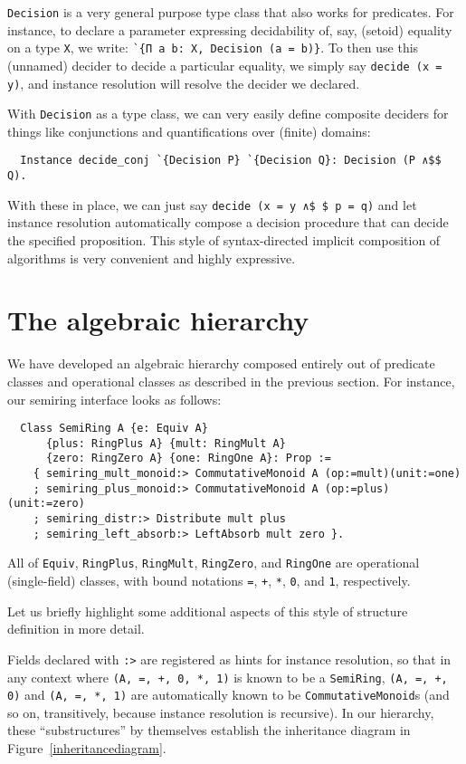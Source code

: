 \documentclass[a4paper,10pt,runningheads]{llncs}
\begin{document}
\lstinline|Decision| is a very general purpose type class that also works for predicates. For instance, to declare a parameter expressing decidability of, say, (setoid) equality on a type \lstinline|X|, we write: \lstinline|`{Π a b: X, Decision (a = b)}|. To then use this (unnamed) decider to decide a particular equality, we simply say \lstinline|decide (x = y)|, and instance resolution will resolve the decider we declared.

With \lstinline|Decision| as a type class, we can very easily define composite deciders for things like conjunctions and quantifications over (finite) domains:
\begin{lstlisting}
  Instance decide_conj `{Decision P} `{Decision Q}: Decision (P ∧$$ Q).
\end{lstlisting}
With these in place, we can just say \lstinline|decide (x = y ∧$ $ p = q)| and let instance resolution automatically compose a decision procedure that can decide the specified proposition. This style of syntax-directed implicit composition of algorithms is very convenient and highly expressive.

\section{The algebraic hierarchy}\label{classes}

We have developed an algebraic hierarchy composed entirely out of predicate classes and operational classes as described in the previous section. For instance, our semiring interface looks as follows:
\begin{lstlisting}
  Class SemiRing A {e: Equiv A}
      {plus: RingPlus A} {mult: RingMult A}
      {zero: RingZero A} {one: RingOne A}: Prop :=
    { semiring_mult_monoid:> CommutativeMonoid A (op:=mult)(unit:=one)
    ; semiring_plus_monoid:> CommutativeMonoid A (op:=plus)(unit:=zero)
    ; semiring_distr:> Distribute mult plus
    ; semiring_left_absorb:> LeftAbsorb mult zero }.
\end{lstlisting}
All of \lstinline|Equiv|, \lstinline|RingPlus|, \lstinline|RingMult|, \lstinline|RingZero|, and \lstinline|RingOne| are operational (single-field) classes, with bound notations \lstinline|=|, \lstinline|+|, \lstinline|*|, \lstinline|0|, and \lstinline|1|, respectively.

Let us briefly highlight some additional aspects of this style of structure definition in more detail.

Fields declared with \lstinline|:>| are registered as hints for instance resolution, so that in any context where \lstinline|(A, =, +, 0, *, 1)| is known to be a \lstinline|SemiRing|, \lstinline|(A, =, +, 0)| and \lstinline|(A, =, *, 1)| are automatically known to be \lstinline|CommutativeMonoid|s (and so on, transitively, because instance resolution is recursive). In our hierarchy, these ``substructures'' by themselves establish the inheritance diagram in Figure~\ref{inheritancediagram}. %
\end{document}
